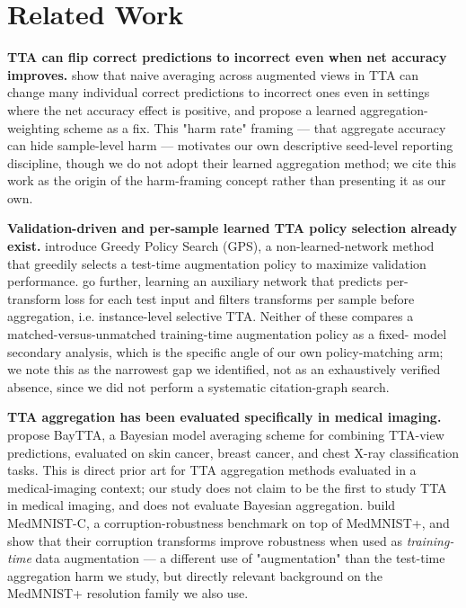 \section{Related Work}

\textbf{TTA can flip correct predictions to incorrect even when net accuracy improves.} \citet{shanmugam2021better} show that naive averaging across augmented views in TTA can change many individual correct predictions to incorrect ones even in settings where the net accuracy effect is positive, and propose a learned aggregation-weighting scheme as a fix. This "harm rate" framing --- that aggregate accuracy can hide sample-level harm --- motivates our own descriptive seed-level reporting discipline, though we do not adopt their learned aggregation method; we cite this work as the origin of the harm-framing concept rather than presenting it as our own.

\textbf{Validation-driven and per-sample learned TTA policy selection already exist.} \citet{lyzhov2020greedy} introduce Greedy Policy Search (GPS), a non-learned-network method that greedily selects a test-time augmentation policy to maximize validation performance. \citet{kim2020learning} go further, learning an auxiliary network that predicts per-transform loss for each test input and filters transforms per sample before aggregation, i.e. instance-level selective TTA. Neither of these compares a matched-versus-unmatched training-time augmentation policy as a fixed- model secondary analysis, which is the specific angle of our own policy-matching arm; we note this as the narrowest gap we identified, not as an exhaustively verified absence, since we did not perform a systematic citation-graph search.

\textbf{TTA aggregation has been evaluated specifically in medical imaging.} \citet{sherkatghanad2024baytta} propose BayTTA, a Bayesian model averaging scheme for combining TTA-view predictions, evaluated on skin cancer, breast cancer, and chest X-ray classification tasks. This is direct prior art for TTA aggregation methods evaluated in a medical-imaging context; our study does not claim to be the first to study TTA in medical imaging, and does not evaluate Bayesian aggregation. \citet{disalvo2024medmnistc} build MedMNIST-C, a corruption-robustness benchmark on top of MedMNIST+, and show that their corruption transforms improve robustness when used as \emph{training-time} data augmentation --- a different use of "augmentation" than the test-time aggregation harm we study, but directly relevant background on the MedMNIST+ resolution family we also use.

